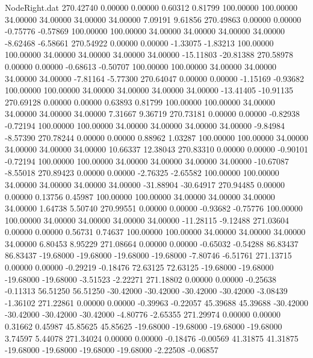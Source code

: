 \begin{filecontents}{NodeRight.dat}
 270.42740    0.00000    0.00000     0.60312    0.81799  100.00000  100.00000   34.00000   34.00000   34.00000   34.00000    7.09191    9.61856
 270.49863    0.00000    0.00000    -0.75776   -0.57869  100.00000  100.00000   34.00000   34.00000   34.00000   34.00000   -8.62468   -6.58661
 270.54922    0.00000    0.00000    -1.33075   -1.83213  100.00000  100.00000   34.00000   34.00000   34.00000   34.00000  -15.11803  -20.81388
 270.58978    0.00000    0.00000    -0.68613   -0.50707  100.00000  100.00000   34.00000   34.00000   34.00000   34.00000   -7.81164   -5.77300
 270.64047    0.00000    0.00000    -1.15169   -0.93682  100.00000  100.00000   34.00000   34.00000   34.00000   34.00000  -13.41405  -10.91135
 270.69128    0.00000    0.00000     0.63893    0.81799  100.00000  100.00000   34.00000   34.00000   34.00000   34.00000    7.31667    9.36719
 270.73181    0.00000    0.00000    -0.82938   -0.72194  100.00000  100.00000   34.00000   34.00000   34.00000   34.00000   -9.84984   -8.57390
 270.78244    0.00000    0.00000     0.88962    1.03287  100.00000  100.00000   34.00000   34.00000   34.00000   34.00000   10.66337   12.38043
 270.83310    0.00000    0.00000    -0.90101   -0.72194  100.00000  100.00000   34.00000   34.00000   34.00000   34.00000  -10.67087   -8.55018
 270.89423    0.00000    0.00000    -2.76325   -2.65582  100.00000  100.00000   34.00000   34.00000   34.00000   34.00000  -31.88904  -30.64917
 270.94485    0.00000    0.00000     0.13756    0.45987  100.00000  100.00000   34.00000   34.00000   34.00000   34.00000    1.64738    5.50740
 270.99551    0.00000    0.00000    -0.93682   -0.75776  100.00000  100.00000   34.00000   34.00000   34.00000   34.00000  -11.28115   -9.12488
 271.03604    0.00000    0.00000     0.56731    0.74637  100.00000  100.00000   34.00000   34.00000   34.00000   34.00000    6.80453    8.95229
 271.08664    0.00000    0.00000    -0.65032   -0.54288   86.83437   86.83437  -19.68000  -19.68000  -19.68000  -19.68000   -7.80746   -6.51761
 271.13715    0.00000    0.00000    -0.29219   -0.18476   72.63125   72.63125  -19.68000  -19.68000  -19.68000  -19.68000   -3.51523   -2.22271
 271.18802    0.00000    0.00000    -0.25638   -0.11313   56.51250   56.51250  -30.42000  -30.42000  -30.42000  -30.42000   -3.08439   -1.36102
 271.22861    0.00000    0.00000    -0.39963   -0.22057   45.39688   45.39688  -30.42000  -30.42000  -30.42000  -30.42000   -4.80776   -2.65355
 271.29974    0.00000    0.00000     0.31662    0.45987   45.85625   45.85625  -19.68000  -19.68000  -19.68000  -19.68000    3.74597    5.44078
 271.34024    0.00000    0.00000    -0.18476   -0.00569   41.31875   41.31875  -19.68000  -19.68000  -19.68000  -19.68000   -2.22508   -0.06857

\end{filecontents}
